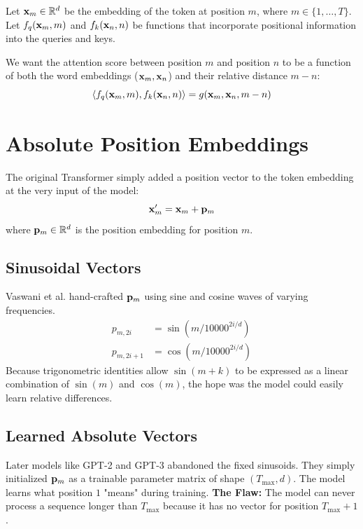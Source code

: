 Let $\mathbf{x}_m \in \mathbb{R}^d$ be the embedding of the token at position $m$, where $m \in \{1, \ldots, T\}$.
Let $f_q(\mathbf{x}_m, m)$ and $f_k(\mathbf{x}_n, n)$ be functions that incorporate positional information into the queries and keys.

We want the attention score between position $m$ and position $n$ to be a function of both the word embeddings ($\mathbf{x}_m, \mathbf{x}_n$) and their relative distance $m-n$:
\begin{equation}
\langle f_q(\mathbf{x}_m, m), f_k(\mathbf{x}_n, n) \rangle = g(\mathbf{x}_m, \mathbf{x}_n, m-n)
\end{equation}

\section{Absolute Position Embeddings}
\label{ch:11:sec:main}

The original Transformer simply added a position vector to the token embedding at the very input of the model:
\begin{equation}
\mathbf{x}_m' = \mathbf{x}_m + \mathbf{p}_m
\end{equation}
where $\mathbf{p}_m \in \mathbb{R}^d$ is the position embedding for position $m$.

\subsection{Sinusoidal Vectors}
Vaswani et al. hand-crafted $\mathbf{p}_m$ using sine and cosine waves of varying frequencies.
\begin{align}
p_{m, 2i} &= \sin(m / 10000^{2i/d}) \\
p_{m, 2i+1} &= \cos(m / 10000^{2i/d})
\end{align}
Because trigonometric identities allow $\sin(m+k)$ to be expressed as a linear combination of $\sin(m)$ and $\cos(m)$, the hope was the model could easily learn relative differences. 

\subsection{Learned Absolute Vectors}
Later models like GPT-2 and GPT-3 abandoned the fixed sinusoids. They simply initialized $\mathbf{p}_m$ as a trainable parameter matrix of shape $(T_{\text{max}}, d)$. The model learns what position $1$ "means" during training.
\textbf{The Flaw:} The model can never process a sequence longer than $T_{\text{max}}$ because it has no vector for position $T_{\text{max}}+1$.


